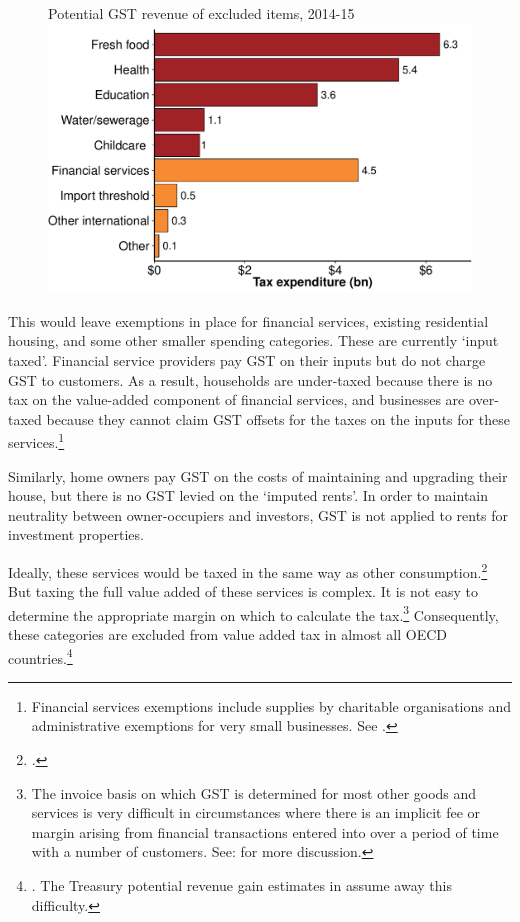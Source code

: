 \begin{figure}
%
{Potential GST revenue of excluded items, 2014-15}
\includegraphics[width=\columnwidth]{atlas/GST_revenue_of_excluded_items1415-1.pdf}

\end{figure}

This would leave exemptions in place for financial services, existing residential housing, and some other smaller spending categories.  These are currently ‘input taxed’. Financial service providers pay GST on their inputs but do not charge GST to customers.  As a result, households are under-taxed because there is no tax on the value-added component of financial services, and businesses are over-taxed because they cannot claim GST offsets for the taxes on the inputs for these services.\footnote{Financial services exemptions include supplies by charitable organisations and administrative exemptions for very small businesses. See \textcite[][169]{Treasury2014TES2013}.}

Similarly, home owners pay GST on the costs of maintaining and upgrading their house, but there is no GST levied on the ‘imputed rents’. In order to maintain neutrality between owner-occupiers and investors, GST is not applied to rents for investment properties.

Ideally, these services would be taxed in the same way as other consumption.\footcites{Freebairn2013}[][52]{HenryTaxReview2010}  But taxing the full value added of these services is complex. It is not easy to determine the appropriate margin on which to calculate the tax.\footnote{The invoice basis on which GST is determined for most other goods and services is very difficult in circumstances where there is an implicit fee or margin arising from financial transactions entered into over a period of time with a number of customers. See: \textcites{Evans2015}{Davis2015} for more discussion.}  
Consequently, these categories are excluded from value added tax in almost all OECD countries.\footnote{\textcite[][21]{OECD2014}. The Treasury potential revenue gain estimates in  assume away this difficulty.}  

